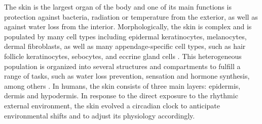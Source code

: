 The skin is the largest organ of the body and one of its main functions is protection against bacteria, radiation or temperature from the exterior, as well as against water loss from the interior. Morphologically, the skin is complex and is populated by many cell types including epidermal keratinocytes, melanocytes, dermal fibroblasts, as well as many appendage-specific cell types, such as hair follicle keratinocytes, sebocytes, and eccrine gland cells \cite{Plikus2015}. This heterogeneous population is organized into several structures and compartments to fulfill a range of tasks, such as water loss prevention, sensation and hormone synthesis, among others \cite{Wong2016, Zouboulis2009}. In humans, the skin consists of three main layers: epidermis, dermis and hypodermis. In response to the direct exposure to the rhythmic external environment, the skin evolved a circadian clock \cite{Allada2021} to anticipate environmental shifts and to adjust its physiology accordingly. 

\newpage

